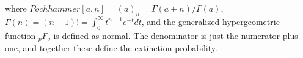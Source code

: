 where
$Pochhammer[a,n] = (a)_n = \Gamma(a+n)/\Gamma(a)$, 
$\Gamma(n) = (n-1)! = \int_0^\infty t^{n-1}e^{-t}dt$, 
and the generalized hypergeometric function ${}_pF_q$ is defined as normal. 
The denominator is just the numerator plus one, and together these define the extinction probability. 

